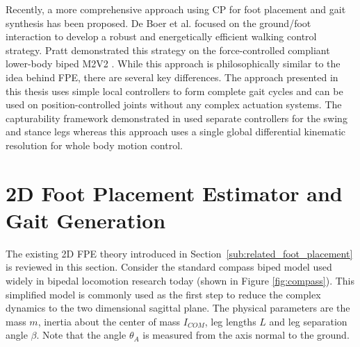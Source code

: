 Recently, a more comprehensive approach using CP for foot placement and gait synthesis has been proposed. De Boer et al. \cite{DeBoer:2012wp,Koolen2012} focused on the ground/foot interaction to develop a robust and energetically efficient walking control strategy. Pratt demonstrated this strategy on the force-controlled compliant lower-body biped M2V2 \cite{Pratt2008,Pratt2012}. While this approach is philosophically similar to the idea behind FPE, there are several key differences. The approach presented in this thesis uses simple local controllers to form complete gait cycles and can be used on position-controlled joints without any complex actuation systems. The capturability framework demonstrated in \cite{Koolen2012,Pratt2012} used separate controllers for the swing and stance legs whereas this approach uses a single global differential kinematic resolution for whole body motion control.








\section{2D Foot Placement Estimator and Gait Generation} %
\label{sec:fpe_algorithm}
The existing 2D FPE theory introduced in Section~\ref{sub:related_foot_placement} is reviewed in this section. Consider the standard compass biped model used widely in bipedal locomotion research today (shown in Figure \ref{fig:compass}). This simplified model is commonly used as the first step to reduce the complex dynamics to the two dimensional sagittal plane. The physical parameters are the mass $m$, inertia about the center of mass $I_{COM}$, leg lengths $L$ and leg separation angle $\beta$. Note that the angle $\theta_A$ is measured from the axis normal to the ground. 


